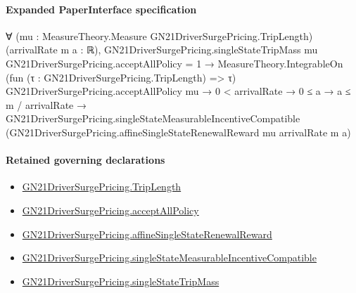 \documentclass[10pt]{article}
\begin{document}
\paragraph{Expanded PaperInterface specification}
\begin{ReviewVerbatim}
∀ (mu : MeasureTheory.Measure GN21DriverSurgePricing.TripLength) (arrivalRate m a : ℝ),
  GN21DriverSurgePricing.singleStateTripMass mu GN21DriverSurgePricing.acceptAllPolicy = 1 →
    MeasureTheory.IntegrableOn (fun (τ : GN21DriverSurgePricing.TripLength) => τ) GN21DriverSurgePricing.acceptAllPolicy
        mu →
      0 < arrivalRate →
        0 ≤ a →
          a ≤ m / arrivalRate →
            GN21DriverSurgePricing.singleStateMeasurableIncentiveCompatible
              (GN21DriverSurgePricing.affineSingleStateRenewalReward mu arrivalRate m a)
\end{ReviewVerbatim}

\paragraph{Retained governing declarations}
\begin{itemize}\raggedright
\item \hyperlink{governing-declaration-a616c143f22cf2bc}{GN21\allowbreak{}Driver\allowbreak{}Surge\allowbreak{}Pricing.\allowbreak{}Trip\allowbreak{}Length}
\item \hyperlink{governing-declaration-e94c9281d4f4b12d}{GN21\allowbreak{}Driver\allowbreak{}Surge\allowbreak{}Pricing.\allowbreak{}accept\allowbreak{}All\allowbreak{}Policy}
\item \hyperlink{governing-declaration-952291e38691b236}{GN21\allowbreak{}Driver\allowbreak{}Surge\allowbreak{}Pricing.\allowbreak{}affine\allowbreak{}Single\allowbreak{}State\allowbreak{}Renewal\allowbreak{}Reward}
\item \hyperlink{governing-declaration-e25dd4d5b0ba5f64}{GN21\allowbreak{}Driver\allowbreak{}Surge\allowbreak{}Pricing.\allowbreak{}single\allowbreak{}State\allowbreak{}Measurable\allowbreak{}Incentive\allowbreak{}Compatible}
\item \hyperlink{governing-declaration-1c88cf5996e161d3}{GN21\allowbreak{}Driver\allowbreak{}Surge\allowbreak{}Pricing.\allowbreak{}single\allowbreak{}State\allowbreak{}Trip\allowbreak{}Mass}
\end{itemize}
\end{document}
